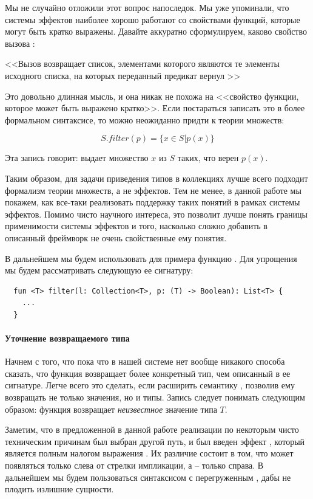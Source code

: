 Мы не случайно отложили этот вопрос напоследок. Мы уже упоминали, что системы эффектов наиболее хорошо работают со свойствами функций, которые могут быть кратко выражены. Давайте аккуратно сформулируем, каково свойство вызова :

<<Вызов  возвращает список, элементами которого являются те элементы исходного списка, на которых переданный предикат вернул  >>

Это довольно длинная мысль, и она никак не похожа на <<свойство функции, которое может быть выражено кратко>>. Если постараться записать это в более формальном синтаксисе, то можно неожиданно придти к теории множеств:

$$ S.filter(p) = \{ x \in S | p(x) \} $$

Эта запись говорит:  выдает множество $x$ из $S$ таких, что верен $p(x)$.

Таким образом, для задачи приведения типов в коллекциях лучше всего подходит формализм теории множеств, а не эффектов. Тем не менее, в данной работе мы покажем, как все-таки реализовать поддержку таких понятий в рамках системы эффектов. Помимо чисто научного интереса, это позволит лучше понять границы применимости системы эффектов и того, насколько сложно добавить в описанный фреймворк не очень свойственные ему понятия.

В дальнейшем мы будем использовать для примера функцию . Для упрощения мы будем рассматривать следующую ее сигнатуру:

\begin{verbatim}
  fun <T> filter(l: Collection<T>, p: (T) -> Boolean): List<T> {
    ...
  }
\end{verbatim}

\paragraph{Уточнение возвращаемого типа}

Начнем с того, что пока что в нашей системе нет вообще никакого способа сказать, что функция возвращает более конкретный тип, чем описанный в ее сигнатуре. Легче всего это сделать, если расширить семантику , позволив ему возвращать не только значения, но и типы. Запись  следует понимать следующим образом: функция возвращает \emph{неизвестное} значение типа $T$.

Заметим, что в предложенной в данной работе реализации по некоторым чисто техническим причинам был выбран другой путь, и был введен эффект , который является полным налогом выражения . Их различие состоит в том, что  может появляться только слева от стрелки импликации, а  -- только справа. В дальнейшем мы будем пользоваться синтаксисом с перегруженным , дабы не плодить излишние сущности.

